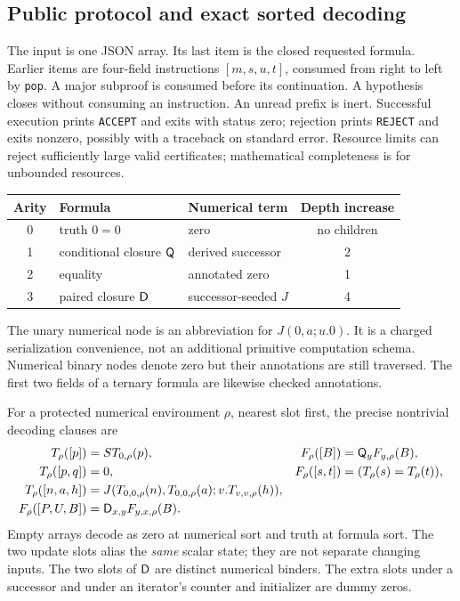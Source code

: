 \subsection{Public protocol and exact sorted decoding}

The input is one JSON array. Its last item is the closed requested
formula. Earlier items are four-field instructions $[m,s,u,t]$, consumed
from right to left by \texttt{pop}. A major subproof is consumed before
its continuation. A hypothesis closes without consuming an instruction.
An unread prefix is inert. Successful execution prints
\texttt{ACCEPT} and exits with status zero; rejection prints
\texttt{REJECT} and exits nonzero, possibly with a traceback on standard
error. Resource limits can reject sufficiently large valid certificates;
mathematical completeness is for unbounded resources.

\begin{center}
\begin{tabular}{cllc}
\toprule
Arity & Formula & Numerical term & Depth increase\\
\midrule
0 & truth $0=0$ & zero & no children\\
1 & conditional closure $\mathsf Q$ & derived successor & 2\\
2 & equality & annotated zero & 1\\
3 & paired closure $\mathsf D$ & successor-seeded $J$ & 4\\
\bottomrule
\end{tabular}
\end{center}
The unary numerical node is an abbreviation for $J(0,a;u.0)$.
It is a charged serialization convenience, not an additional primitive
computation schema. Numerical binary nodes denote zero but their
annotations are still traversed. The first two fields of a ternary
formula are likewise checked annotations.

For a protected numerical environment $\rho$, nearest slot first, the
precise nontrivial decoding clauses are
\[
\begin{aligned}
 T_\rho([p])&=S T_{0,\rho}(p),&
 F_\rho([B])&=\mathsf Q_y F_{y,\rho}(B),\\
 T_\rho([p,q])&=0,&
 F_\rho([s,t])&=(T_\rho(s)=T_\rho(t)),\\
 T_\rho([n,a,h])&=
 J(T_{0,0,\rho}(n),T_{0,0,\rho}(a);v.T_{v,v,\rho}(h)),\\
 F_\rho([P,U,B])&=\mathsf D_{x,y}F_{y,x,\rho}(B).
\end{aligned}
\]
Empty arrays decode as zero at numerical sort and truth at formula sort.
The two update slots alias the \emph{same} scalar state; they are not
separate changing inputs. The two slots of $\mathsf D$ are distinct numerical
binders. The extra slots under a successor and under an iterator's
counter and initializer are dummy zeros.

